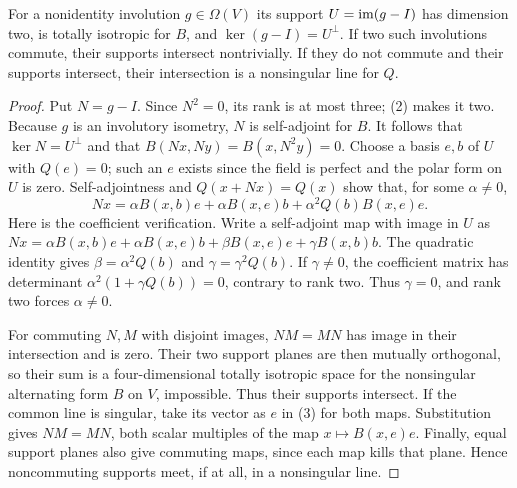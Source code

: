 \documentclass[11pt,a4paper]{article}
\begin{document}
\begin{lemma}\label{support}
For a nonidentity involution $g\in\Omega(V)$ its support
$U=\operatorname{im}(g-I)$ has dimension two, is totally isotropic for $B$, and
$\ker(g-I)=U^\perp$. If two such involutions commute, their supports intersect
nontrivially. If they do not commute and their supports intersect, their
intersection is a nonsingular line for $Q$.
\end{lemma}
\begin{proof}
Put $N=g-I$. Since $N^2=0$, its rank is at most three; (2) makes it two.
Because $g$ is an involutory isometry, $N$ is self-adjoint for $B$.
It follows that $\ker N=U^\perp$ and that $B(Nx,Ny)=B(x,N^2y)=0$.
Choose a basis $e,b$ of $U$ with $Q(e)=0$; such an $e$ exists since the
field is perfect and the polar form on $U$ is zero. Self-adjointness and
$Q(x+Nx)=Q(x)$ show that, for some $\alpha\ne0$,
\[
 Nx=\alpha B(x,b)e+\alpha B(x,e)b
       +\alpha^2Q(b)B(x,e)e.\tag{3}
\]
Here is the coefficient verification. Write a self-adjoint map with image
in $U$ as
$Nx=\alpha B(x,b)e+\alpha B(x,e)b+\beta B(x,e)e+\gamma B(x,b)b$.
The quadratic identity gives $\beta=\alpha^2Q(b)$ and
$\gamma=\gamma^2Q(b)$. If $\gamma\ne0$, the coefficient matrix has
determinant $\alpha^2(1+\gamma Q(b))=0$, contrary to rank two.
Thus $\gamma=0$, and rank two forces $\alpha\ne0$.

For commuting $N,M$ with disjoint images, $NM=MN$ has image in their
intersection and is zero. Their two support planes are then mutually
orthogonal, so their sum is a four-dimensional totally isotropic space for
the nonsingular alternating form $B$ on $V$, impossible. Thus their supports
intersect. If the common line is singular, take its vector as $e$ in (3)
for both maps. Substitution gives $NM=MN$, both scalar multiples of the map
$x\mapsto B(x,e)e$. Finally, equal support planes also give commuting maps,
since each map kills that plane. Hence noncommuting supports meet, if at all,
in a nonsingular line.
\end{proof}
\end{document}
